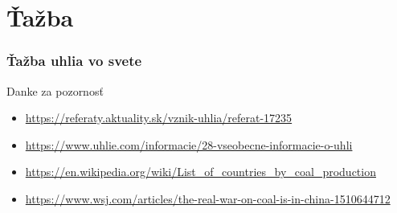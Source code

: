 \documentclass{beamer}
\begin{document}
\section{Ťažba}

\renewcommand{\arraystretch}{1.5}

\begin{frame}
	\frametitle{Ťažba uhlia vo svete}
	\centering


\end{frame}

\begin{frame}
	\Large
	\centering

\end{frame}

\begin{frame}
	Danke za pozornosť

	\pause

	\begin{itemize}
		\item \url{https://referaty.aktuality.sk/vznik-uhlia/referat-17235}
		\item \url{https://www.uhlie.com/informacie/28-vseobecne-informacie-o-uhli}
		\item \url{https://en.wikipedia.org/wiki/List_of_countries_by_coal_production}
		\item \url{https://www.wsj.com/articles/the-real-war-on-coal-is-in-china-1510644712}
	\end{itemize}
\end{frame}
\end{document}
